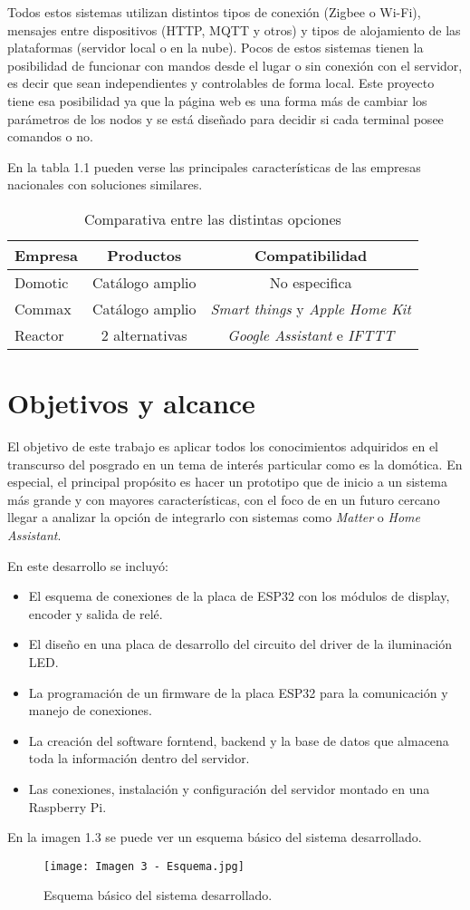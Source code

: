 Todos estos sistemas utilizan distintos tipos de conexión (Zigbee o Wi-Fi), mensajes entre dispositivos (HTTP, MQTT y otros) y tipos de alojamiento de las plataformas (servidor local o en la nube).
Pocos de estos sistemas tienen la posibilidad de funcionar con mandos desde el lugar o sin conexión con el servidor, es decir que sean independientes y controlables de forma local. Este proyecto tiene esa posibilidad ya que la página web es una forma más de cambiar los parámetros de los nodos y se está diseñado para decidir si cada terminal posee comandos o no.

En la tabla 1.1 pueden verse las principales características de las empresas nacionales con soluciones similares.

\begin{table}[h]
\centering
\caption[Mercado nacional]{Comparativa entre las distintas opciones}
\begin{tabular}{l c c}
\toprule
\textbf{Empresa} & \textbf{Productos} & \textbf{Compatibilidad}\\
\midrule
Domotic	& Catálogo amplio & No especifica \\
Commax	& Catálogo amplio & \textit{Smart things} y \textit{Apple Home Kit}	\\
Reactor	& 2 alternativas & \textit{Google Assistant} e \textit{IFTTT} \\
\bottomrule
\hline
\end{tabular}
\label{tab:peces}
\end{table}

\section{Objetivos y alcance}

El objetivo de este trabajo es aplicar todos los conocimientos adquiridos en el transcurso del posgrado en un tema de interés particular como es la domótica. En especial, el principal propósito es hacer un prototipo que de inicio a un sistema más grande y con mayores características, con el foco de en un futuro cercano llegar a analizar la opción de integrarlo con sistemas como \textit{Matter} o \textit{Home Assistant}.

En este desarrollo se incluyó:
\begin{itemize}
	\item El esquema de conexiones de la placa de ESP32 con los módulos de display, encoder y salida de relé.
	\item El diseño en una placa de desarrollo del circuito del driver de la iluminación LED.
	\item La programación de un firmware de la placa ESP32 para la comunicación y manejo de conexiones.
	\item La creación del software forntend, backend y la base de datos que almacena toda la información dentro del servidor.
	\item Las conexiones, instalación y configuración del servidor montado en una Raspberry Pi.
\end{itemize}

En la imagen 1.3 se puede ver un esquema básico del sistema desarrollado.
\begin{figure}[h]
\centering
\texttt{[image: Imagen 3 - Esquema.jpg]}
\caption[Esquema básico]{Esquema básico del sistema desarrollado.}
\label{fig:1}
\end{figure}